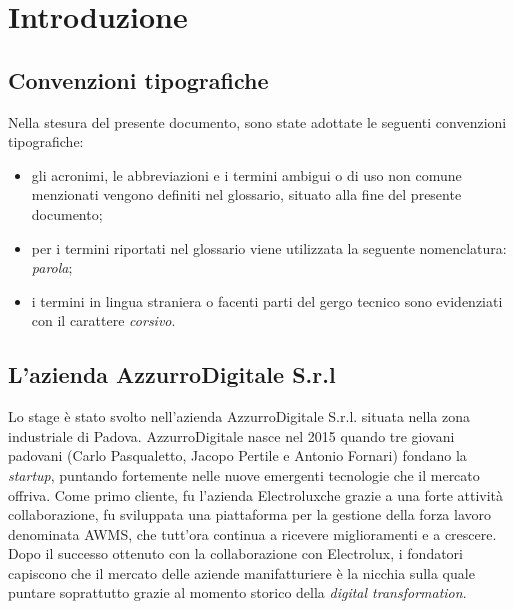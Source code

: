 
\chapter{Introduzione}
\label{cap:introduzione}

\section{Convenzioni tipografiche}
Nella stesura del presente documento, sono state adottate le seguenti convenzioni tipografiche:
\begin{itemize}
	\item gli acronimi, le abbreviazioni e i termini ambigui o di uso non comune menzionati vengono definiti nel glossario, situato alla fine del presente documento;
	\item per i termini riportati nel glossario viene utilizzata la seguente nomenclatura: \emph{parola}\glsfirstoccur;
	\item i termini in lingua straniera o facenti parti del gergo tecnico sono evidenziati con il carattere \emph{corsivo}.
\end{itemize}




\section{L'azienda AzzurroDigitale S.r.l}

Lo stage è stato svolto nell'azienda AzzurroDigitale S.r.l. situata nella zona industriale di Padova. AzzurroDigitale nasce nel 2015 quando tre giovani padovani (Carlo Pasqualetto, Jacopo Pertile e Antonio Fornari) fondano la \emph{startup}, puntando fortemente nelle nuove emergenti tecnologie che il mercato offriva. Come primo cliente, fu l'azienda \gls{Electrolux}\glsfirstoccur che grazie a una forte attività collaborazione, fu sviluppata una piattaforma per la gestione della forza lavoro denominata \gls{AWMS}, che tutt’ora continua a ricevere miglioramenti e a crescere. Dopo il successo ottenuto con la collaborazione con \gls{Electrolux}\ap{[g]}, i fondatori capiscono che il mercato delle aziende manifatturiere è la nicchia sulla quale puntare soprattutto grazie al momento storico della \emph{digital transformation}. 

